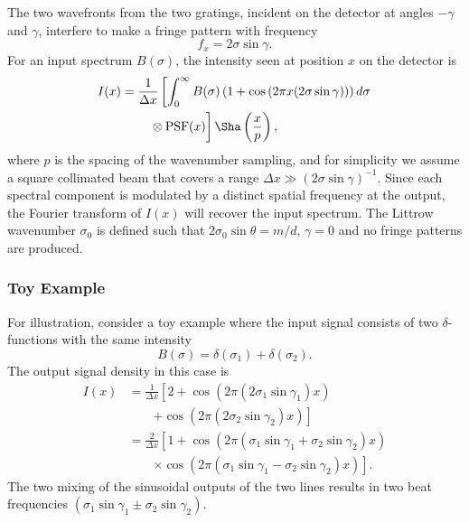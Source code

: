 \documentclass[preprint2, 10pt]{aastex}
\begin{document}
The two wavefronts from the two gratings, incident on the detector at angles $-\gamma$ and $\gamma$, interfere to make a fringe
pattern with  frequency
\begin{equation}
f_x=2\sigma\sin{\gamma}.
\end{equation}
For an input spectrum $B(\sigma)$, the intensity seen at position $x$ on the detector is
\begin{align}
I(x)& =\frac{1}{\Delta x}\left[\int_{0}^{\infty} B(\sigma)\left(1+\cos{\left(2 \pi x (2\sigma \sin{\gamma})\right)}\right)d\sigma \right. \nonumber \\
& \qquad \left.\vphantom{\int_{0}^{\infty}} \otimes \mbox{PSF}(x)\right]\Sha\left(\frac{x}{p}\right),
\end{align}
where  $p$ is the spacing of the wavenumber sampling, and for simplicity we assume a square collimated beam that covers
a range  $\Delta x \gg \left(2\sigma \sin{\gamma}\right)^{-1}$.
Since each spectral component is modulated by a distinct spatial
frequency at the output, the Fourier transform of $I(x)$ will recover the
input spectrum.
The Littrow wavenumber $\sigma_0$ is defined such that $2\sigma_0\sin{\theta}=m/d$, $\gamma=0$ and no fringe patterns are produced.

\subsubsection{Toy Example}
\label{toy:sec} 

For illustration, consider a toy example where the input signal consists of two $\delta$-functions with the same intensity
\begin{equation}
B(\sigma)=\delta(\sigma_1)+\delta(\sigma_2).
\end{equation}
The output signal density in this case is
\begin{align}
I(x)&=\frac{1}{\Delta x}\left[2+ \cos{\left(2 \pi (2\sigma_1  \sin{\gamma_1})x \right)} \right. \nonumber \\
& \qquad \left.+ \cos{\left(2\pi (2  \sigma_2  \sin{\gamma_2})x \right)}\right]\\
&=\frac{2}{\Delta x}\left[1+ \cos{\left(2 \pi  (\sigma_1  \sin{\gamma_1}+ \sigma_2  \sin{\gamma_2})x \right)}  \right. \nonumber \\
& \qquad \left. \times\cos{\left(2\pi  (\sigma_1  \sin{\gamma_1}- \sigma_2  \sin{\gamma_2})x\right)}\right].
\end{align}
The two mixing of the sinusoidal outputs of the two lines results in two beat frequencies $(\sigma_1  \sin{\gamma_1}\pm\sigma_2  \sin{\gamma_2})$.
\end{document}
